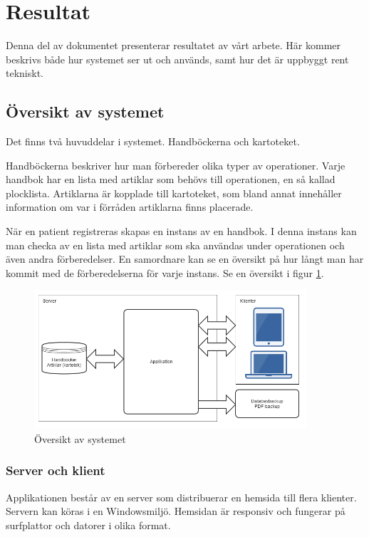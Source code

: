 \section{Resultat}
Denna del av dokumentet presenterar resultatet av vårt arbete.
Här kommer beskrivs både hur systemet ser ut och används, samt hur det är uppbyggt rent tekniskt.

\subsection{Översikt av systemet}
Det finns två huvuddelar i systemet. Handböckerna och kartoteket.

Handböckerna beskriver hur man förbereder olika typer av operationer.
Varje handbok har en lista med artiklar som behövs till operationen, en så kallad plocklista.
Artiklarna är kopplade till kartoteket, som bland annat innehåller information om var i förråden artiklarna finns placerade.

När en patient registreras skapas en instans av en handbok.
I denna instans kan man checka av en lista med artiklar som ska användas under operationen och även andra förberedelser.
En samordnare kan se en översikt på hur långt man har kommit med de förberedelserna för varje instans.
Se en översikt i figur \ref{fig:overview}.

\begin{figure}[htbp]
  \centering
  \includegraphics[width=0.9\textwidth]{images/overview.png}
  \caption{Översikt av systemet}
  \label{fig:overview}
\end{figure}

\subsubsection{Server och klient}
Applikationen består av en server som distribuerar en hemsida till flera klienter.
Servern kan köras i en Windowsmiljö.
Hemsidan är responsiv och fungerar på surfplattor och datorer i olika format.

